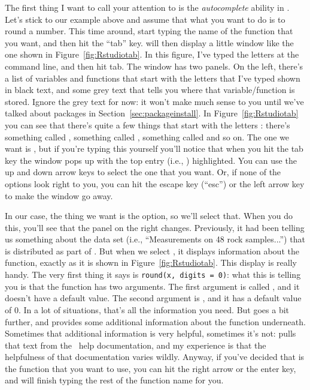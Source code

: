 The first thing I  want to call your attention to is the {\it autocomplete} ability in \Rstudio.
Let's stick to our example above and assume that what you want to do is to round a number. This time around, start typing the name of the function that you want, and then hit the ``tab'' key. \Rstudio will then display a little window like the one shown in Figure~\ref{fig:Rstudiotab}. In this figure, I've typed the letters  at the command line, and then hit tab. The window has two panels. On the left, there's a list of variables and functions that start with the letters that I've typed shown in black text, and some grey text that tells you where that variable/function is stored. Ignore the grey text for now: it won't make much sense to you until we've talked about packages in Section~\ref{sec:packageinstall}. In Figure~\ref{fig:Rstudiotab} you can see that there's quite a few things that start with the letters : there's something called , something called , something called  and so on. The one we want is , but if you're typing this yourself you'll notice that when you hit the tab key the window pops up with the top entry (i.e., ) highlighted. You can use the up and down arrow keys to select the one that you want. Or, if none of the options look right to you, you can hit the escape key (``esc'') or the left arrow key to make the window go away. 

In our case, the thing we want is the  option, so we'll select that. When you do this, you'll see that the panel on the right changes. Previously, it had been telling us something about the  data set (i.e., ``Measurements on 48 rock samples...'') that is distributed as part of \R. But when we select , it displays information about the  function, exactly as it is shown in Figure~\ref{fig:Rstudiotab}. This display is really handy. The very first thing it says is \texttt{round(x, digits = 0)}: what this is telling you is that the  function has two arguments. The first argument is called , and it doesn't have a default value. The second argument is , and it has a default value of 0. In a lot of situations, that's all the information you need. But \Rstudio goes a bit further, and provides some additional information about the function underneath. Sometimes that additional information is very helpful, sometimes it's not: \Rstudio pulls that text from the \R\ help documentation, and my experience is that the helpfulness of that documentation varies wildly. Anyway, if you've decided that  is the function that you want to use, you can hit the right arrow or the enter key, and \Rstudio will finish typing the rest of the function name for you. 

